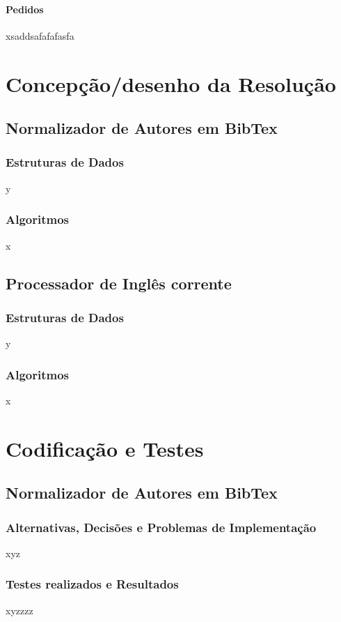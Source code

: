 \documentclass{report}
\begin{document}
\subsubsection{Pedidos}
xsaddsafafafasfa

\chapter{Concepção/desenho da Resolução} \label{cd}

\section{Normalizador de Autores em BibTex}
\subsection{Estruturas de Dados}
y
\subsection{Algoritmos}
x

\section{Processador de Inglês corrente}
\subsection{Estruturas de Dados}
y
\subsection{Algoritmos}
x

\chapter{Codificação e Testes} \label{ct}

\section{Normalizador de Autores em BibTex}

\subsection{Alternativas, Decisões e Problemas de Implementação}
xyz

\subsection{Testes realizados e Resultados}
xyzzzz
\end{document}
